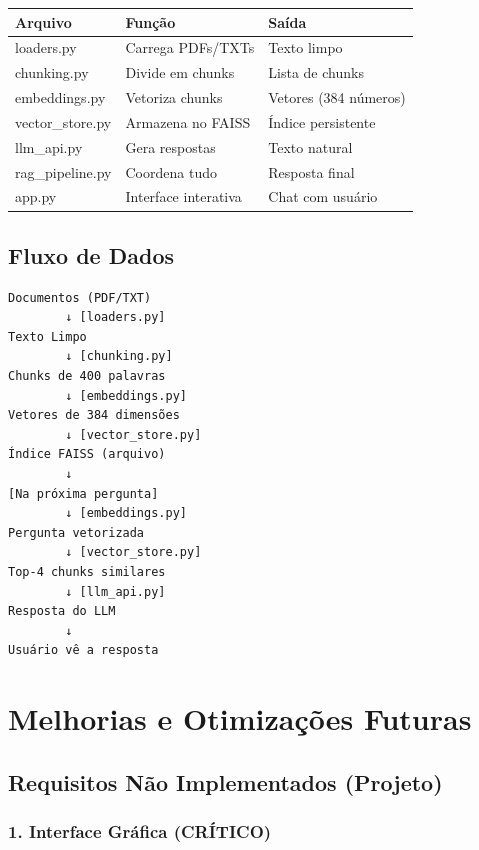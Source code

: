 \documentclass[12pt,a4paper]{article}
\begin{document}
\begin{table}[h]
    \centering
    \begin{tabular}{|l|l|l|}
        \hline
        \textbf{Arquivo} & \textbf{Função} & \textbf{Saída} \\
        \hline
        loaders.py & Carrega PDFs/TXTs & Texto limpo \\
        \hline
        chunking.py & Divide em chunks & Lista de chunks \\
        \hline
        embeddings.py & Vetoriza chunks & Vetores (384 números) \\
        \hline
        vector\_store.py & Armazena no FAISS & Índice persistente \\
        \hline
        llm\_api.py & Gera respostas & Texto natural \\
        \hline
        rag\_pipeline.py & Coordena tudo & Resposta final \\
        \hline
        app.py & Interface interativa & Chat com usuário \\
        \hline
    \end{tabular}
\end{table}

\subsection{Fluxo de Dados}

\begin{verbatim}
Documentos (PDF/TXT)
        ↓ [loaders.py]
Texto Limpo
        ↓ [chunking.py]
Chunks de 400 palavras
        ↓ [embeddings.py]
Vetores de 384 dimensões
        ↓ [vector_store.py]
Índice FAISS (arquivo)
        ↓
[Na próxima pergunta]
        ↓ [embeddings.py]
Pergunta vetorizada
        ↓ [vector_store.py]
Top-4 chunks similares
        ↓ [llm_api.py]
Resposta do LLM
        ↓
Usuário vê a resposta
\end{verbatim}

\section{Melhorias e Otimizações Futuras}

\subsection{Requisitos Não Implementados (Projeto)}

\subsubsection{1. Interface Gráfica (CRÍTICO)}
\end{document}
